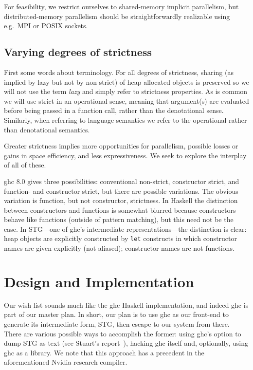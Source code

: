 \documentclass{llncs}
\begin{document}
For feasibility, we restrict ourselves to shared-memory implicit parallelism,
but distributed-memory parallelism should be straightforwardly realizable
using e.g.\ MPI or POSIX sockets.

\subsection{Varying degrees of strictness}

First some words about terminology.  For all degrees of strictness, sharing
(as implied by lazy but not by non-strict) of heap-allocated objects is
preserved so we will not use the term \emph{lazy} and simply refer to
strictness properties.  As is common we will use strict in an operational
sense, meaning that argument(s) are evaluated before being passed in a
function call, rather than the denotational sense.  Similarly, when referring
to language semantics we refer to the operational rather than denotational
semantics.

Greater strictness implies more opportunities for parallelism, possible losses
or gains in space efficiency, and less expressiveness.  We seek to explore
the interplay of all of these.

ghc 8.0 gives three possibilities: conventional non-strict, constructor
strict, and function- and constructor strict, but there are possible
variations.  The obvious variation is function, but not constructor,
strictness.  In Haskell the distinction between constructors and functions is
somewhat blurred because constructors behave like functions (outside of
pattern matching), but this need not be the case.  In STG---one of ghc's
intermediate representations---the distinction is clear: heap objects are
explicitly constructed by \texttt{let} constructs in which constructor names
are given explicitly (not aliased); constructor names are not functions.

\section{Design and Implementation}

Our wish list sounds much like the ghc Haskell implementation, and indeed ghc
is part of our master plan.  In short, our plan is to use ghc as our front-end
to generate its intermediate form, STG, then escape to our system from there.
There are various possible ways to accomplish the former: using ghc's option
to dump STG as text (see Stuart's report~\cite{Stuart}), hacking ghc itself
and, optionally, using ghc as a library.  We note that this approach has
a precedent in the aforementioned Nvidia research compiler.
\end{document}
